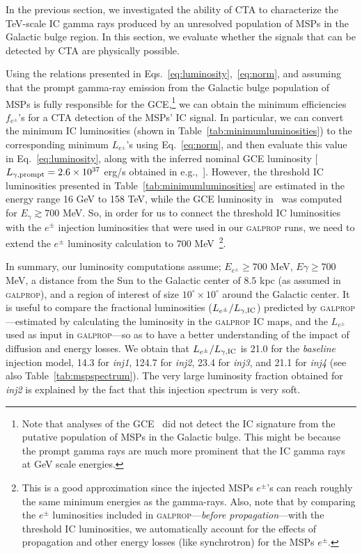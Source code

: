 \documentclass[doublespace,nopageskip]{VTthesis} %
\begin{document}
In the previous section, we  investigated the ability of CTA to characterize the TeV-scale IC gamma rays produced by an unresolved population of MSPs in the Galactic bulge region. In this section, we evaluate whether the signals that can be detected by CTA are physically possible.

 Using the relations presented in Eqs.~\ref{eq:luminosity},~\ref{eq:norm}, and assuming that the prompt gamma-ray emission from the Galactic bulge population of MSPs is fully responsible for the GCE,\footnote{Note that analyses of the  
 GCE~\citep{2016PhRvD..93j3004L} did not detect the IC signature from the putative population of MSPs in the Galactic bulge. This might be because the prompt gamma rays are much more prominent that the IC gamma rays at GeV scale energies.}  we can obtain the minimum efficiencies $f_{e^\pm}$'s for a CTA detection of the MSPs' IC signal. In particular, we can convert the minimum IC luminosities (shown in Table~\ref{tab:minimumluminosities}) to the corresponding minimum $L_{e^\pm}$'s using Eq.~\ref{eq:norm}, and then evaluate this value in  Eq.~\ref{eq:luminosity}, along with the inferred nominal GCE luminosity [$L_{\gamma, {\rm prompt}}=2.6\times 10^{37}$ erg/s obtained in e.g.,~\citet{2019JCAP...09..042M}]. However, the threshold IC luminosities presented in Table~\ref{tab:minimumluminosities} are estimated in the energy range 16 GeV to 158 TeV, while the GCE luminosity in~\citet{2019JCAP...09..042M} was computed for $E_{\gamma} \gtrsim 700$ MeV. So, in order for us to connect the threshold IC luminosities with the $e^\pm$ injection luminosities that were used in our \textsc{galprop} runs, we need to extend the $e^\pm$ luminosity calculation to $700$ MeV~\footnote{This is a good approximation since the injected MSPs $e^\pm$'s can reach roughly the same minimum energies as the gamma-rays. Also, note that by comparing the $e^\pm$ luminosities included in \textsc{galprop}---\textit{before propagation}---with the threshold IC luminosities, we automatically account for the effects of propagation and other energy losses (like synchrotron) for the MSPs $e^\pm$.}. 

In summary, our luminosity computations assume; $E_{e^\pm}\geq700$ MeV, $E{\gamma}\geq700$ MeV, a distance from the Sun to the Galactic center of $8.5$ kpc (as assumed in \textsc{galprop}), and a region of interest of size $10^\circ\times10^\circ$ around the Galactic center. It is useful to compare the fractional luminosities ($L_{e^\pm}/L_{\gamma, {\rm IC}}$) predicted by \textsc{galprop}---estimated by calculating the luminosity in the \textsc{galprop} IC maps, and the $L_{e^\pm}$ used as input in \textsc{galprop}---so as to have a better understanding of the impact of diffusion and energy losses. We obtain that $L_{e^\pm}/L_{\gamma, {\rm IC}}$ is 21.0 for the \textit{baseline} injection model, 14.3 for \textit{inj1}, 124.7 for \textit{inj2}, 23.4 for \textit{inj3}, and 21.1 for \textit{inj4} (see also Table~\ref{tab:mspspectrum}). The very large luminosity fraction obtained for \textit{inj2} is explained by the fact that this injection spectrum is very soft.       
\end{document}
